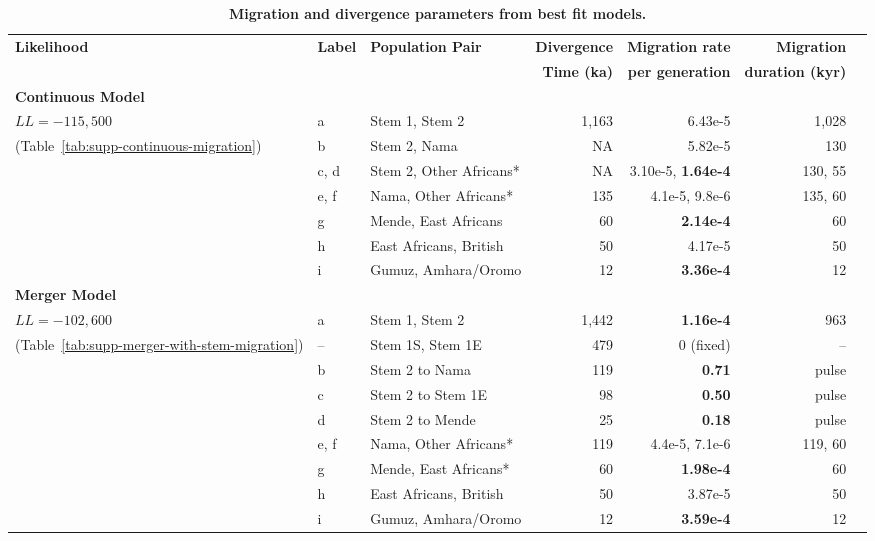 \documentclass[]{article}
\begin{document}
\begin{table}[t!]
    \centering
    \scriptsize
    \begin{tabular}{lllrrrr}
        \toprule
        \textbf{Likelihood} & \textbf{Label} & \textbf{Population Pair} &
            \textbf{Divergence} & \textbf{Migration rate} & \textbf{Migration} \\
        & & & 
            \textbf{Time (ka)} & \textbf{per generation} & \textbf{duration (kyr)} \\
        \midrule
        \textbf{Continuous Model} & & & & & \\
        $LL= -115,500$ & a & Stem 1, Stem 2 & 1,163 & 6.43e-5 & 1,028 \\
        (Table~\ref{tab:supp-continuous-migration}) & b & Stem 2, Nama & NA & 5.82e-5 & 130 \\
        & c, d & Stem 2, Other Africans* & NA & 3.10e-5, \textbf{1.64e-4} & 130, 55 \\
        & e, f & Nama, Other Africans* & 135 & 4.1e-5, 9.8e-6 & 135, 60 \\
        & g & Mende, East Africans & 60 & \textbf{2.14e-4} & 60 \\
        & h & East Africans, British & 50 & 4.17e-5 & 50 \\
        & i & Gumuz, Amhara/Oromo & 12 &\textbf{3.36e-4} & 12 \\
        \textbf{Merger Model} & & & & & \\
        $LL= -102,600$ & a & Stem 1, Stem 2 & 1,442 & \textbf{1.16e-4} & 963 \\
        (Table~\ref{tab:supp-merger-with-stem-migration}) & -- & Stem 1S, Stem 1E & 479 & 0 (fixed) & -- \\
        & b & Stem 2 to Nama & 119 & \textbf{0.71} & pulse \\
        & c & Stem 2 to Stem 1E & 98 & \textbf{0.50} & pulse \\
        & d & Stem 2 to Mende & 25 & \textbf{0.18} & pulse \\
        & e, f & Nama, Other Africans* & 119 & 4.4e-5, 7.1e-6 & 119, 60 \\
        & g & Mende, East Africans* & 60 & \textbf{1.98e-4} & 60 \\
        & h & East Africans, British & 50 & 3.87e-5 & 50 \\
        & i & Gumuz, Amhara/Oromo &12 & \textbf{3.59e-4} & 12 \\
        \bottomrule
    \end{tabular}
    \caption{
        \textbf{Migration and divergence parameters from best fit models.}
}
\end{table}
\end{document}
